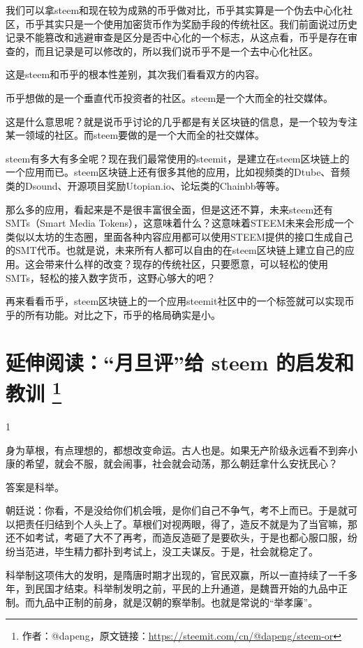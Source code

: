 \documentclass[]{ctexbook}
\begin{document}
我们可以拿steem和现在较为成熟的币乎做对比，币乎其实算是一个伪去中心化社区，币乎其实只是一个使用加密货币作为奖励手段的传统社区。我们前面说过历史记录不能篡改和逃避审查是区分是否中心化的一个标志，从这点看，币乎是存在审查的，而且记录是可以修改的，所以我们说币乎不是一个去中心化社区。

这是steem和币乎的根本性差别，其次我们看看双方的内容。

币乎想做的是一个垂直代币投资者的社区。steem是一个大而全的社交媒体。

这是什么意思呢？就是说币乎讨论的几乎都是有关区块链的信息，是一个较为专注某一领域的社区。而steem要做的是一个大而全的社交媒体。

steem有多大有多全呢？现在我们最常使用的steemit，是建立在steem区块链上的一个应用而已。steem区块链上还有很多其他的应用，比如视频类的Dtube、音频类的Dsound、开源项目奖励Utopian.io、论坛类的Chainbb等等。

那么多的应用，看起来是不是很丰富很全面，但是这还不算，未来steem还有SMTs（Smart Media Tokens），这意味着什么？这意味着STEEM未来会形成一个类似以太坊的生态圈，里面各种内容应用都可以使用STEEM提供的接口生成自己的SMT代币。也就是说，未来所有人都可以自由的在steem区块链上建立自己的应用。这会带来什么样的改变？现存的传统社区，只要愿意，可以轻松的使用SMTs，轻松的接入数字货币，这野心够大的吧？

再来看看币乎，steem区块链上的一个应用steemit社区中的一个标签就可以实现币乎的所有功能。对比之下，币乎的格局确实是小。

\hypertarget{-steem-}{%
\section[延伸阅读：``月旦评''给 steem 的启发和教训 ]{\texorpdfstring{延伸阅读：``月旦评''给 steem 的启发和教训 \footnote{作者：@dapeng，原文链接：\url{https://steemit.com/cn/@dapeng/steem-or}}}{延伸阅读：``月旦评''给 steem 的启发和教训 }}\label{-steem-}}

1

身为草根，有点理想的，都想改变命运。古人也是。如果无产阶级永远看不到奔小康的希望，就会不服，就会闹事，社会就会动荡，那么朝廷拿什么安抚民心？

答案是科举。

朝廷说：你看，不是没给你们机会哦，是你们自己不争气，考不上而已。于是就可以把责任归结到个人头上了。草根们对视两眼，得了，造反不就是为了当官嘛，那还不如考试，考砸了大不了再考，而造反造砸了是要砍头，于是也都心服口服，纷纷当范进，毕生精力都扑到考试上，没工夫谋反。于是，社会就稳定了。

科举制这项伟大的发明，是隋唐时期才出现的，官民双赢，所以一直持续了一千多年，到民国才结束。科举制发明之前，平民的上升通道，是魏晋开始的九品中正制。而九品中正制的前身，就是汉朝的察举制。也就是常说的``举孝廉''。
\end{document}
